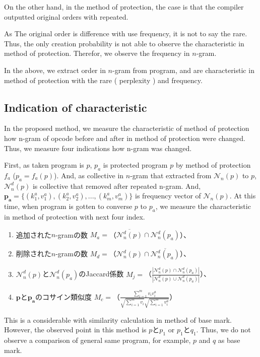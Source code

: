 \documentclass[conference]{IEEEtran}
\newcommand{\distinct}[1]{\mathcal{N}_n^d(#1)}
\begin{document}
On the other hand, in the method of protection, the case is that the
compiler outputted original orders with repeated.

As The original order is difference with use frequency, it is not to
say the rare.  Thus, the only creation probability is not able to
observe the characteristic in method of protection.  Therefor, we
observe the frequency in $n$-gram.

In the above, we extract order in $n$-gram from program, and are
characteristic in method of protection with the rare ( perplexity )
and frequency.
%

\subsection{Indication of characteristic}

In the proposed method, we measure the characteristic of method of
protection how n-gram of opcode before and after in method of
protection were changed.  Thus, we measure four indications how n-gram
was changed.

First, as taken program is $p$, $p_a$ is protected program $p$ by
method of protection $f_a$ ($p_a=f_a(p)$).  And, as collective in
$n$-gram that extracted from $\mathcal{N}_n(p)$ to $p$, $\distinct{p}$
is collective that removed after repeated n-gram.  And, $\bm{p_a}=\{
(k^a_1, v^a_1), (k^a_2, v^a_2), ..., (k^a_m, v^a_m) \}$ is frequency
vector of $\mathcal{N}_n(p)$.  At this time, when program is gotten to
converse $p$ to $p_a$, we measure the characteristic in method of
protection with next four index.

\begin{enumerate}
\item 追加された$n$-gramの数 $M_a=$（$\overline{\distinct{p}} \cap
  \distinct{p_a}$）、
\item 削除された$n$-gramの数 $M_d=$（$\distinct{p} \cap
  \overline{\distinct{p_a}}$）、
\item $\distinct{p}$と$\distinct{p_a}$のJaccard係数
  $M_j=$（$\displaystyle \frac{|\distinct{p} \cap
    \distinct{p_a}|}{|\distinct{p} \cup \distinct{p_a}|}$）、
\item $\bm{p}$と$\bm{p_a}$のコサイン類似度 $M_c=$（$\displaystyle
  \frac{\sum_{i=1}^{m} v_i v^a_i}{\sqrt{\sum_{i=1}^m v_i}
    \sqrt{\sum_{i=1}^m v^a_i}}$）
\end{enumerate}
%

This is a considerable with similarity calculation in method of base
mark.  However, the observed point in this method is $p$と$p_1$ or
$p_1$と$q_1$.  Thus, we do not observe a comparison of general same
program, for example, $p$ and $q$ as base mark.
\end{document}
